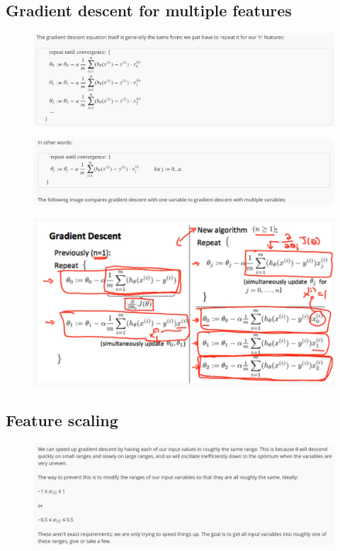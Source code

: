 \documentclass[12pt, A4,onecolumn]{article} %
\begin{document}
\subsection{Gradient descent for multiple features}

\begin{figure}[H]
	\centering
	\includegraphics[width=1\textwidth]{./Imagenes/gradDes1}
\end{figure}

\begin{figure}[H]
	\centering
	\includegraphics[width=1\textwidth]{./Imagenes/gradDes2}
\end{figure}

\begin{figure}[H]
	\centering
	\includegraphics[width=1\textwidth]{./Imagenes/gradDes3}
\end{figure}


\subsection{Feature scaling}
\begin{figure}[H]
	\centering
	\includegraphics[width=1\textwidth]{./Imagenes/featScal1}
\end{figure}
\end{document}
